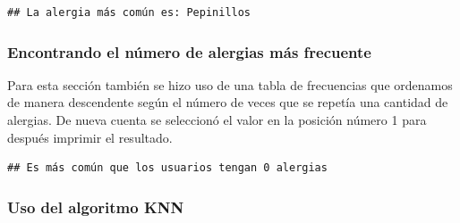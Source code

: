 \documentclass[
]{article}
\newenvironment{Shaded}{\begin{snugshade}}{\end{snugshade}}
\newcommand{\AttributeTok}[1]{\textcolor[rgb]{0.77,0.63,0.00}{#1}}
\newcommand{\CommentTok}[1]{\textcolor[rgb]{0.56,0.35,0.01}{\textit{#1}}}
\newcommand{\ConstantTok}[1]{\textcolor[rgb]{0.00,0.00,0.00}{#1}}
\newcommand{\DecValTok}[1]{\textcolor[rgb]{0.00,0.00,0.81}{#1}}
\newcommand{\FunctionTok}[1]{\textcolor[rgb]{0.00,0.00,0.00}{#1}}
\newcommand{\NormalTok}[1]{#1}
\newcommand{\OtherTok}[1]{\textcolor[rgb]{0.56,0.35,0.01}{#1}}
\newcommand{\SpecialCharTok}[1]{\textcolor[rgb]{0.00,0.00,0.00}{#1}}
\newcommand{\StringTok}[1]{\textcolor[rgb]{0.31,0.60,0.02}{#1}}
\begin{document}
\begin{verbatim}
## La alergia más común es: Pepinillos
\end{verbatim}

\hypertarget{encontrando-el-nuxfamero-de-alergias-muxe1s-frecuente}{%
\subsubsection{Encontrando el número de alergias más
frecuente}\label{encontrando-el-nuxfamero-de-alergias-muxe1s-frecuente}}

Para esta sección también se hizo uso de una tabla de frecuencias que
ordenamos de manera descendente según el número de veces que se repetía
una cantidad de alergias. De nueva cuenta se seleccionó el valor en la
posición número 1 para después imprimir el resultado.

\begin{Shaded}
\end{Shaded}

\begin{verbatim}
## Es más común que los usuarios tengan 0 alergias
\end{verbatim}

\hypertarget{uso-del-algoritmo-knn}{%
\subsubsection{Uso del algoritmo KNN}\label{uso-del-algoritmo-knn}}
\end{document}
